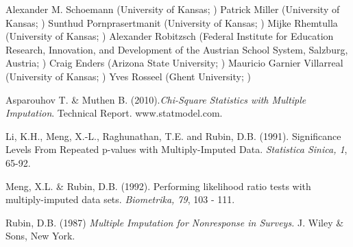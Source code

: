 \documentclass[a4paper]{book}
\begin{document}
%
\begin{Author}\relax
Alexander M. Schoemann (University of Kansas;  )
Patrick Miller (University of Kansas; )
Sunthud Pornprasertmanit (University of Kansas; )
Mijke Rhemtulla (University of Kansas; )
Alexander Robitzsch (Federal Institute for Education Research, Innovation, and Development of the Austrian School System, Salzburg, Austria; )
Craig Enders (Arizona State University; )
Mauricio Garnier Villarreal (University of Kansas; )
Yves Rosseel (Ghent University; )
\end{Author}
%
\begin{References}\relax
Asparouhov T. \& Muthen B. (2010).\emph{Chi-Square Statistics with Multiple Imputation}. Technical Report. www.statmodel.com. 

Li, K.H., Meng, X.-L., Raghunathan, T.E. and Rubin, D.B. (1991). Significance Levels From Repeated p-values with Multiply-Imputed Data. \emph{Statistica Sinica, 1}, 65-92.

Meng, X.L. \& Rubin, D.B. (1992). Performing likelihood ratio tests with multiply-imputed data sets. \emph{Biometrika, 79}, 103 - 111.

Rubin, D.B. (1987) \emph{Multiple Imputation for Nonresponse in Surveys.} J. Wiley \& Sons, New York.
\end{References}
%
\end{document}
